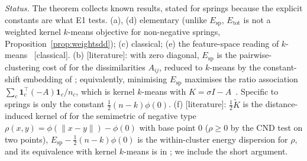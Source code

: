 \documentclass[11pt,a4paper]{article}
\theoremstyle{plain}
\theoremstyle{definition}
\theoremstyle{remark}
\newcommand{\spec}{\mathrm{sp}}
\newcommand{\tot}{\mathrm{tot}}
\newcommand{\one}{\mathbf 1}
\newcommand{\status}[1]{\textsf{\small [#1]}}
\begin{document}
\noindent\emph{Status.} The theorem collects known results, stated for springs because the explicit constants are what E1 tests. (a), (d) elementary (unlike $E_\spec$, $E_\tot$ is not a weighted kernel $k$-means objective for non-negative springs, Proposition~\ref{prop:weightsdd}); (c) classical; (e) the feature-space reading of $k$-means~\citep{zha2001,girolami2002} \status{classical}. (b) \status{literature}: with zero diagonal, $E_\spec$ is the pairwise-clustering cost of \citet{hofmann1997} for the dissimilarities $A_{ij}$, reduced to $k$-means by the constant-shift embedding of \citet{roth2003}; equivalently, minimising $E_\spec$ maximises the ratio association $\sum_c\one_c^{\!\top}(-A)\one_c/n_c$, which is kernel $k$-means with $K=\sigma I-A$~\citep{dhillon2005tr,dhillon2007}. Specific to springs is only the constant $\tfrac12(n-k)\phi(0)$. (f) \status{literature}: $\tfrac12\widetilde K$ is the distance-induced kernel of \citet{sejdinovic2013} for the semimetric of negative type $\rho(x,y)=\phi(\lVert x-y\rVert)-\phi(0)$ with base point $0$ ($\rho\ge0$ by the CND test on two points), $E_\spec-\tfrac12(n-k)\phi(0)$ is the within-cluster energy dispersion for $\rho$, and its equivalence with kernel $k$-means is in \citet{franca2021}; we include the short argument.
\end{document}
